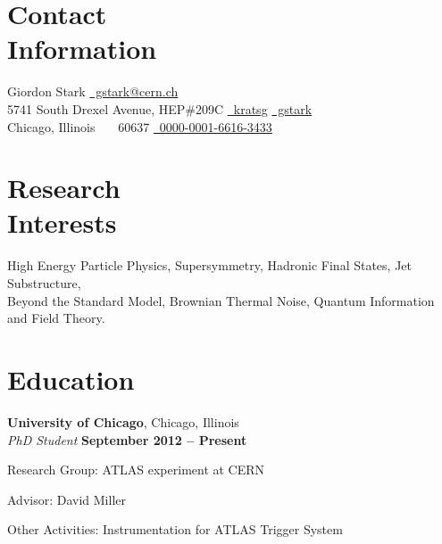 \documentclass[margin,line]{resume}
\let\origsection\section%
\let\section\subsection%
\let\section\origsection%
\begin{document}
\begin{resume}

\section{\mysidestyle Contact\\Information}

Giordon Stark						\hfill \href{mailto:gstark@cern.ch}{~gstark@cern.ch}
\vspace{0mm}\\\vspace{0mm}%
5741 South Drexel Avenue, HEP\#209C \hfill \href{https://github.com/kratsg}{~kratsg} {\large\rmfamily\textbullet} \href{https://gitlab.cern.ch/gstark}{~gstark}
\vspace{0mm}\\\vspace{0mm}%
Chicago, Illinois \ \ \ 60637    \hfill \href{https://orcid.org/0000-0001-6616-3433}{~0000-0001-6616-3433} \\
\vspace{-4.5mm}%

\section{\mysidestyle Research\\Interests}

High Energy Particle Physics, Supersymmetry, Hadronic Final States, Jet Substructure, \\
Beyond the Standard Model, Brownian Thermal Noise, Quantum Information and Field Theory.

    \section{\mysidestyle Education}

	\textbf{University of Chicago}, Chicago, Illinois \vspace{2mm}\\\vspace{1mm}%
	\textsl{PhD Student} \hfill \textbf{September 2012 -- Present}\vspace{-3mm}\\\vspace{-1mm}%
	\begin{list2}
		\item Research Group: ATLAS experiment at CERN
		\item Advisor: David Miller
		\item Other Activities: Instrumentation for ATLAS Trigger System
	\end{list2}\vspace{-1.5mm}


\end{resume}
\end{document}
